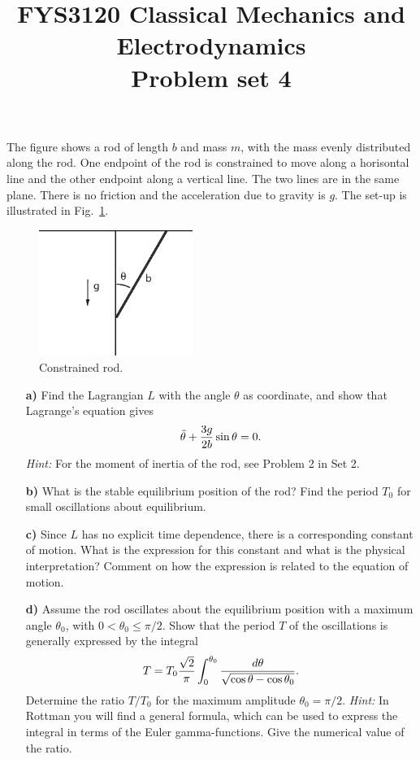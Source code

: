 \documentclass[11pt,a4paper]{report}
\title{FYS3120 Classical Mechanics and Electrodynamics\\ 
\vspace{15mm}Problem set 4}
\newcounter{excount}[chapter]
\newenvironment{exercise}[1][]{\addtocounter{excount}{1} \noindent {\bf Problem
    \arabic{excount} \ \ #1}\hspace{2mm}}{\vspace{4mm}}
\begin{document}
\maketitle


\begin{exercise}
The figure shows a rod of length $b$ and mass $m$, with the mass evenly distributed along the rod.
One endpoint of the rod is constrained to move along a horisontal line and the other endpoint along a vertical line. The two lines are in the same plane. There is no friction and the acceleration due to gravity is $g$. The set-up is illustrated in Fig.~\ref{fig:con_rod}.

\begin{figure}[h]
\begin{center}
\includegraphics[width=5cm]{ConstrainedRod.eps}
\end{center}
\caption{Constrained rod.}
\label{fig:con_rod}
\end{figure}

\begin{itemize}
\item[\bf a)] Find the Lagrangian $L$ with the angle $\theta$ as coordinate, and show that Lagrange's equation gives
\begin{equation}
\ddot\theta+{3g\over {2b}}\sin\theta=0.
\end{equation}
{\it Hint:} For the moment of inertia of the rod, see Problem 2 in Set 2.
\item[\bf b)] What is the stable equilibrium position of the rod? Find the period $T_0$ for small oscillations about equilibrium.
\item[\bf c)] Since $L$ has no explicit time dependence, there is a corresponding constant of motion. What is the expression for this constant and what is the physical interpretation? Comment on how the expression is related to the equation of motion.
\item[\bf d)] Assume the rod oscillates about the equilibrium position with a maximum angle $\theta_0$, with $0<\theta_0\leq \pi/2$. Show that the period $T$ of the oscillations is generally expressed by the integral
\begin{equation}
T=T_0 {\sqrt 2\over \pi} \int_0^{\theta_0}\frac{d\theta}{\sqrt{\cos\theta-\cos\theta_0}}.
\end{equation}
Determine the ratio $T/T_0$ for the maximum amplitude $\theta_0=\pi/2$. {\it Hint:} In Rottman you will find a general formula, which can be used to express the integral in terms of the Euler gamma-functions. Give the numerical value of the ratio.
\end{itemize}
\end{exercise}
\end{document}
